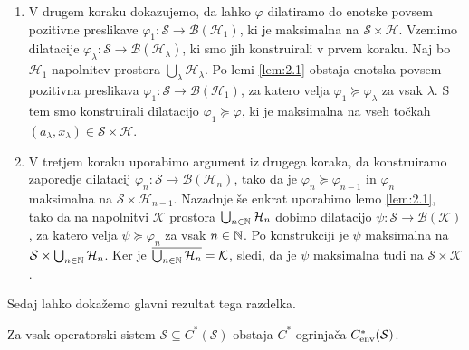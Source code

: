 \begin{dokaz}
\begin{enumerate}
        \item V drugem koraku dokazujemo, da lahko $\varphi$ dilatiramo do enotske povsem pozitivne preslikave $\varphi_1 : \mathcal{S} \to \mathcal{B} (\mathcal{H}_1)$,
        ki je maksimalna na $\mathcal{S} \times \mathcal{H}$. 
        Vzemimo dilatacije $\varphi_\lambda: \mathcal{S} \to \mathcal{B}(\mathcal{H}_\lambda)$, ki smo jih konstruirali v prvem koraku.
        Naj bo $\mathcal{H}_1$ napolnitev prostora $\bigcup_{\lambda} \mathcal{H}_\lambda$. 
        Po lemi \ref{lem:2.1} obstaja enotska povsem pozitivna preslikava $\varphi_1: \mathcal{S} \to \mathcal{B}(\mathcal{H}_1)$,
        za katero velja $\varphi_1 \succeq \varphi_\lambda$ za vsak $\lambda$. S tem smo konstruirali dilatacijo $\varphi_1 \succeq \varphi$,
        ki je maksimalna na vseh točkah $(a_\lambda, x_\lambda) \in \mathcal{S} \times \mathcal{H}$.

        \item V tretjem koraku uporabimo argument iz drugega koraka, da konstruiramo zaporedje dilatacij
        $\varphi_n: \mathcal{S} \to \mathcal{B}(\mathcal{H}_n)$,
        tako da je $\varphi_n \succeq \varphi_{n - 1}$ in $\varphi_n$ maksimalna na $\mathcal{S} \times \mathcal{H}_{n - 1}$.
        Nazadnje še enkrat uporabimo lemo \ref{lem:2.1}, tako da na napolnitvi $\mathcal{K}$ prostora $\bigcup_{n \in \mathbb N} \mathcal{H}_n$
        dobimo dilatacijo $\psi: \mathcal{S} \to \mathcal{B}(\mathcal{K})$, za katero velja $\psi \succeq \varphi_n$ za vsak $n \in \mathbb N$.
        Po konstrukciji je $\psi$ maksimalna na $\mathcal{S} \times \bigcup_{n \in \mathbb N} \mathcal{H}_n$.
        Ker je $\overline{\bigcup_{n \in \mathbb N} \mathcal{H}_n} = \mathcal{K}$, sledi, da je $\psi$ maksimalna tudi na $\mathcal{S} \times \mathcal{K}$. \qedhere
    \end{enumerate}
\end{dokaz}

Sedaj lahko dokažemo glavni rezultat tega razdelka.

\begin{izrek}\label{izr:2.3}
    Za vsak operatorski sistem $\mathcal{S} \subseteq C^*(\mathcal{S})$ obstaja $C^*$-ogrinjača $C^* _{\operatorname{env}} (\mathcal{S})$.
\end{izrek}

